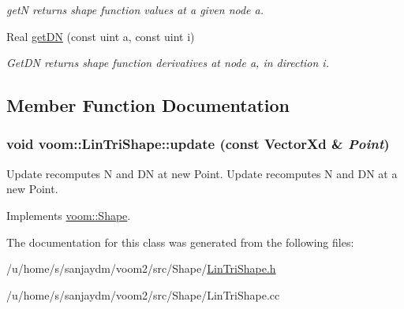 \begin{DoxyCompactItemize}
\begin{DoxyCompactList}\small\item\em getN returns shape function values at a given node a. \item\end{DoxyCompactList}\item 
\hypertarget{classvoom_1_1_lin_tri_shape_a418e9f637c1178859d422308ef881df7}{
Real \hyperlink{classvoom_1_1_lin_tri_shape_a418e9f637c1178859d422308ef881df7}{getDN} (const uint a, const uint i)}
\label{classvoom_1_1_lin_tri_shape_a418e9f637c1178859d422308ef881df7}

\begin{DoxyCompactList}\small\item\em GetDN returns shape function derivatives at node a, in direction i. \item\end{DoxyCompactList}\end{DoxyCompactItemize}


\subsection{Member Function Documentation}
\hypertarget{classvoom_1_1_lin_tri_shape_a3802bf83a7e1ee9310bdb6d6558bd7ad}{
\subsubsection[{update}]{\setlength{\rightskip}{0pt plus 5cm}void voom::LinTriShape::update (const VectorXd \& {\em Point})}}
\label{classvoom_1_1_lin_tri_shape_a3802bf83a7e1ee9310bdb6d6558bd7ad}


Update recomputes N and DN at new Point. Update recomputes N and DN at a new Point. 

Implements \hyperlink{classvoom_1_1_shape_a8ded544de12647543b056cec61be9f26}{voom::Shape}.

The documentation for this class was generated from the following files:\begin{DoxyCompactItemize}
\item 
/u/home/s/sanjaydm/voom2/src/Shape/\hyperlink{_lin_tri_shape_8h}{LinTriShape.h}\item 
/u/home/s/sanjaydm/voom2/src/Shape/LinTriShape.cc\end{DoxyCompactItemize}
